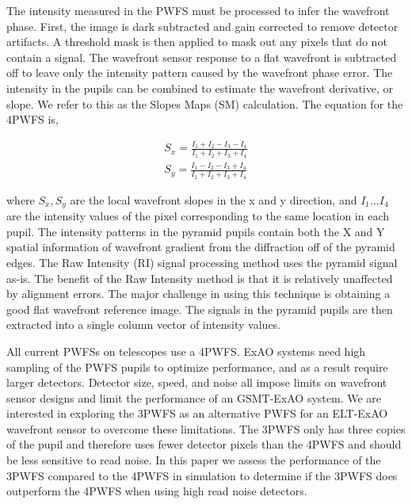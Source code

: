 The intensity measured in the PWFS must be processed to infer the wavefront phase. First, the image is dark subtracted and gain corrected to remove detector artifacts. A threshold mask is then applied to mask out any pixels that do not contain a signal. The wavefront sensor response to a flat wavefront is subtracted off to leave only the intensity pattern caused by the wavefront phase error. The intensity in the pupils can be combined to estimate the wavefront derivative, or slope. We refer to this as the Slopes Maps (SM) calculation. The equation for the 4PWFS is,


\begin{eqnarray}
    S_x=\frac{I_1+I_2-I_3-I_4}{I_1+I_2+I_3+I_4}     \label{4PWFSslopes} \\
    S_y=\frac{I_1-I_2-I_3+I_4}{I_1+I_2+I_3+I_4} \nonumber
\end{eqnarray}

where $S_x, S_y$ are the local wavefront slopes in the x and y direction, and $I_1...I_4$ are the intensity values of the pixel corresponding to the same location in each pupil. The intensity patterns in the pyramid pupils contain both the X and Y spatial information of wavefront gradient from the diffraction off of the pyramid edges. The Raw Intensity (RI) signal processing method uses the pyramid signal as-is. The benefit of the Raw Intensity method is that it is relatively unaffected by alignment errors. The major challenge in using this technique is obtaining a good flat wavefront reference image. The signals in the pyramid pupils are then extracted into a single column vector of intensity values.

All current PWFSs on telescopes use a 4PWFS. ExAO systems need high sampling of the PWFS pupils to optimize performance, and as a result require larger detectors. Detector size, speed, and noise all impose limits on wavefront sensor designs and limit the performance of an GSMT-ExAO system. We are interested in exploring the 3PWFS as an alternative PWFS for an ELT-ExAO wavefront sensor to overcome these limitations. The 3PWFS only has three copies of the pupil and therefore uses fewer detector pixels than the 4PWFS and should be less sensitive to read noise. In this paper we assess the performance of the 3PWFS compared to the 4PWFS in simulation to determine if the 3PWFS does outperform the 4PWFS when using high read noise detectors.

